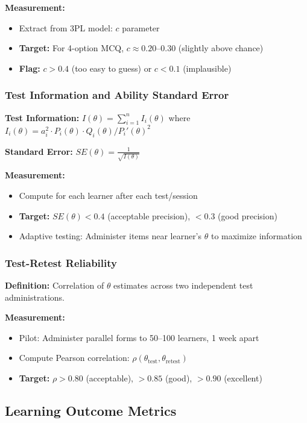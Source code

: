 \documentclass[11pt,letterpaper]{article}
\begin{document}
\textbf{Measurement:}
\begin{itemize}
\item Extract from 3PL model: $c$ parameter
\item \textbf{Target:} For 4-option MCQ, $c \approx 0.20$--$0.30$ (slightly above chance)
\item \textbf{Flag:} $c > 0.4$ (too easy to guess) or $c < 0.1$ (implausible)
\end{itemize}

\subsubsection{Test Information and Ability Standard Error}\label{subsubsec:test-information}

\textbf{Test Information:} $I(\theta) = \sum_{i=1}^{n} I_i(\theta)$ where $I_i(\theta) = a_i^2 \cdot P_i(\theta) \cdot Q_i(\theta) / P_i'(\theta)^2$

\textbf{Standard Error:} $SE(\theta) = \frac{1}{\sqrt{I(\theta)}}$

\textbf{Measurement:}
\begin{itemize}
\item Compute for each learner after each test/session
\item \textbf{Target:} $SE(\theta) < 0.4$ (acceptable precision), $< 0.3$ (good precision)
\item Adaptive testing: Administer items near learner's $\theta$ to maximize information
\end{itemize}

\subsubsection{Test-Retest Reliability}\label{subsubsec:test-retest-reliability}

\textbf{Definition:} Correlation of $\theta$ estimates across two independent test administrations.

\textbf{Measurement:}
\begin{itemize}
\item Pilot: Administer parallel forms to 50--100 learners, 1 week apart
\item Compute Pearson correlation: $\rho(\theta_{\text{test}}, \theta_{\text{retest}})$
\item \textbf{Target:} $\rho > 0.80$ (acceptable), $> 0.85$ (good), $> 0.90$ (excellent)
\end{itemize}

\subsection{Learning Outcome Metrics}\label{subsec:learning-outcome-metrics}
\end{document}
